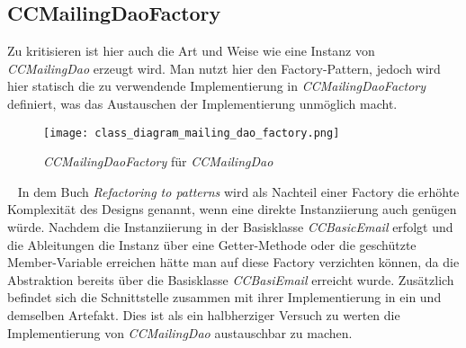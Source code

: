 \subsection{CCMailingDaoFactory}
Zu kritisieren ist hier auch die Art und Weise wie eine Instanz von \emph{CCMailingDao} erzeugt wird. Man nutzt hier den Factory-Pattern, jedoch wird hier statisch die zu verwendende Implementierung in \emph{CCMailingDaoFactory} definiert, was das Austauschen der Implementierung unmöglich macht.
\begin{figure}[h]
\centering
\texttt{[image: class\_diagram\_mailing\_dao\_factory.png]} 
\caption{\emph{CCMailingDaoFactory} für \emph{CCMailingDao}}
\label{fig:klassen-hierarchie-ccmailingfactory}
\end{figure}
\ \newline 
In dem Buch \emph{Refactoring to patterns} \cite[72]{refactoreToPatterns} wird als Nachteil einer Factory die erhöhte Komplexität des Designs genannt, wenn eine direkte Instanziierung auch genügen würde. Nachdem die Instanziierung in der Basisklasse \emph{CCBasicEmail} erfolgt und die Ableitungen die Instanz über eine Getter-Methode oder die geschützte Member-Variable erreichen hätte man auf diese Factory verzichten können, da die Abstraktion bereits über die Basisklasse \emph{CCBasiEmail} erreicht wurde. 
\newline
\newline
Zusätzlich befindet sich die Schnittstelle zusammen mit ihrer Implementierung in ein und demselben Artefakt. Dies ist als ein halbherziger Versuch zu werten die Implementierung von \emph{CCMailingDao} austauschbar zu machen.  
\newpage
